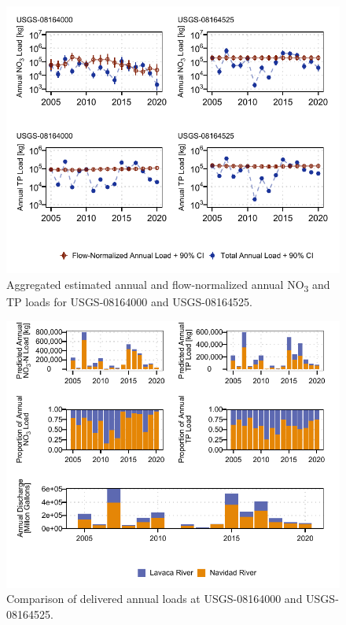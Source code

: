 \documentclass[water,article,submit,oneauthor]{Definitions/mdpi}
\begin{document}
\begin{figure}
\centering
\includegraphics{Schramm-Manuscript-2023_files/figure-latex/fig3-1.pdf}
\caption{Aggregated estimated annual and flow-normalized annual
NO\textsubscript{3} and TP loads for USGS-08164000 and USGS-08164525.}
\end{figure}

\begin{figure}
\centering
\includegraphics{Schramm-Manuscript-2023_files/figure-latex/fig4-1.pdf}
\caption{Comparison of delivered annual loads at USGS-08164000 and
USGS-08164525.}
\end{figure}
\end{document}
